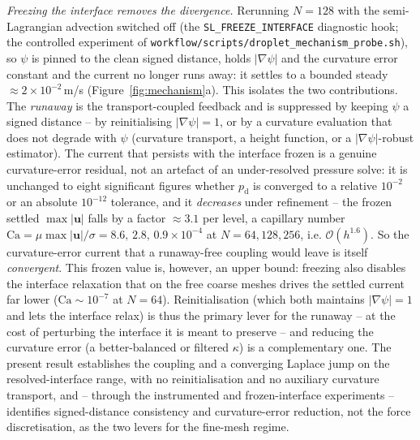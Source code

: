 \documentclass[preprint,3p,11pt]{elsarticle}
\newcommand{\psilev}{\psi}                       %
\newcommand{\uvec}{\mathbf{u}}
\newcommand{\gradpsi}{\lvert\nabla\psilev\rvert}
\begin{document}
\emph{Freezing the interface removes the divergence.} Rerunning $N=128$ with the semi-Lagrangian
advection switched off (the \texttt{SL\_FREEZE\_INTERFACE} diagnostic hook; the controlled
experiment of \texttt{workflow/scripts/droplet\_mechanism\_probe.sh}), so $\psilev$ is pinned to
the clean signed distance, holds $\lvert\nabla\psilev\rvert$ and the curvature error constant and
the current no longer runs away: it settles to a bounded steady $\approx2\times10^{-2}$\,m/s
(Figure~\ref{fig:mechanism}a). This isolates the two contributions. The \emph{runaway} is the
transport-coupled feedback and is suppressed by keeping $\psilev$ a signed distance -- by
reinitialising $\gradpsi=1$, or by a curvature evaluation that does not degrade with $\psilev$
(curvature transport, a height function, or a $\lvert\nabla\psilev\rvert$-robust estimator). The
current that persists with the interface frozen is a genuine curvature-error residual, not an
artefact of an under-resolved pressure solve: it is unchanged to eight significant figures whether
$p_{\mathrm d}$ is converged to a relative $10^{-2}$ or an absolute $10^{-12}$ tolerance, and it
\emph{decreases} under refinement -- the frozen settled $\max\lvert\uvec\rvert$ falls by a factor
$\approx3.1$ per level, a capillary number
$\mathrm{Ca}=\mu\max\lvert\uvec\rvert/\sigma=8.6,\,2.8,\,0.9\times10^{-4}$ at $N=64,128,256$, i.e.
$\mathcal{O}(h^{1.6})$. So the curvature-error current that a runaway-free coupling would leave is
itself \emph{convergent}. This frozen value is, however, an upper bound: freezing also disables the
interface relaxation that on the free coarse meshes drives the settled current far lower
($\mathrm{Ca}\sim10^{-7}$ at $N=64$). Reinitialisation (which both maintains $\gradpsi=1$ and lets
the interface relax) is thus the primary lever for the runaway -- at the cost of perturbing the
interface it is meant to preserve -- and reducing the curvature error (a better-balanced or filtered
$\kappa$) is a complementary one. The present result establishes the coupling and a converging Laplace jump on
the resolved-interface range, with no reinitialisation and no auxiliary curvature transport, and --
through the instrumented and frozen-interface experiments -- identifies signed-distance consistency
and curvature-error reduction, not the force discretisation, as the two levers for the fine-mesh
regime.
\end{document}
